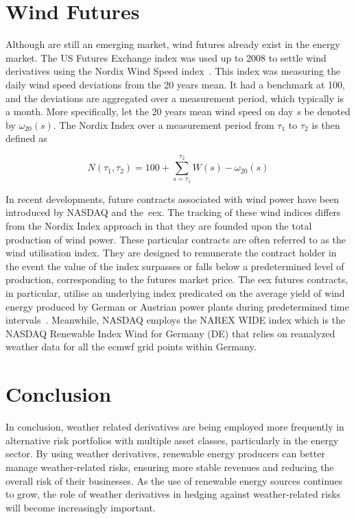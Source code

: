 \section{Wind Futures}
\label{sec:wind_futures}

    Although are still an emerging market, wind futures already exist in the energy market.
    The US Futures Exchange index was used up to 2008 to settle wind derivatives using the Nordix Wind Speed index~\cite{benth_dynamic_2009}.
    This index was measuring the daily wind speed deviations from the 20 years mean.
    It had a benchmark at 100, and the deviations are aggregated over a measurement period,
    which typically is a month.
    More specifically, let the 20 years mean wind speed on day $s$ be denoted by $\omega_{20}(s)$.
    The Nordix Index over a measurement period from $\tau_1$ to $\tau_2$ is then defined as

    \begin{equation}
        N (\tau_1, \tau_2) = 100 + \sum_{s=\tau_1}^{\tau_2} W(s) - \omega_{20}(s)
    \label{eq:nordix_wind_speed}
    \end{equation}

    In recent developments, future contracts associated with wind power have been introduced by NASDAQ and the~\gls{eex}.
    The tracking of these wind indices differs from the Nordix Index approach in that they are founded upon the
    total production of wind power.
    These particular contracts are often referred to as the wind utilisation index.
    They are designed to remunerate the contract holder in the event the value of the index surpasses or falls below a
    predetermined level of production, corresponding to the futures market price.
    The \gls{eex} futures contracts, in particular, utilise an underlying index predicated on the average yield
    of wind energy produced by German or Austrian power plants during predetermined time intervals~\cite{thomaidis_handling_2023}.
    Meanwhile, NASDAQ employs the NAREX WIDE index which is the NASDAQ Renewable Index Wind for Germany (DE)
    that relies on reanalyzed weather data for all the \gls{ecmwf} grid points within Germany.

\section{Conclusion}
\label{sec:weather_conclusion}

    In conclusion, weather related derivatives are being employed more frequently in alternative risk portfolios with
    multiple asset classes, particularly in the energy sector.
    By using weather derivatives, renewable energy producers can better manage weather-related risks,
    ensuring more stable revenues and reducing the overall risk of their businesses.
    As the use of renewable energy sources continues to grow,
    the role of weather derivatives in hedging against weather-related risks will become increasingly important.


